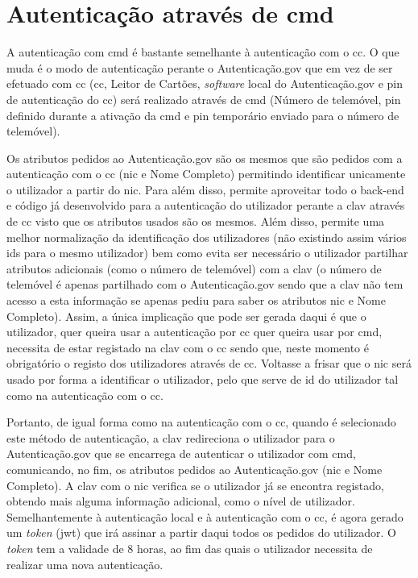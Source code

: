 \section{Autenticação através de \acrshort{cmd}}

A autenticação com \acrshort{cmd} é bastante semelhante à autenticação com o \acrshort{cc}. O que muda é o modo de autenticação perante o Autenticação.gov que em vez de ser efetuado com \acrshort{cc} (\acrlong{cc}, Leitor de Cartões, \textit{software} local do Autenticação.gov e \acrshort{pin} de autenticação do \acrshort{cc}) será realizado através de \acrshort{cmd} (Número de telemóvel, \acrshort{pin} definido durante a ativação da \acrshort{cmd} e \acrshort{pin} temporário enviado para o número de telemóvel).

Os atributos pedidos ao Autenticação.gov são os mesmos que são pedidos com a autenticação com o \acrshort{cc} (\acrshort{nic} e Nome Completo) permitindo identificar unicamente o utilizador a partir do \acrshort{nic}. Para além disso, permite aproveitar todo o back-end e código já desenvolvido para a autenticação do utilizador perante a \acrshort{clav} através de \acrshort{cc} visto que os atributos usados são os mesmos. Além disso, permite uma melhor normalização da identificação dos utilizadores (não existindo assim vários ids para o mesmo utilizador) bem como evita ser necessário o utilizador partilhar atributos adicionais (como o número de telemóvel) com a \acrshort{clav} (o número de telemóvel é apenas partilhado com o Autenticação.gov sendo que a \acrshort{clav} não tem acesso a esta informação se apenas pediu para saber os atributos \acrshort{nic} e Nome Completo). Assim, a única implicação que pode ser gerada daqui é que o utilizador, quer queira usar a autenticação por \acrshort{cc} quer queira usar por \acrshort{cmd}, necessita de estar registado na \acrshort{clav} com o \acrshort{cc} sendo que, neste momento é obrigatório o registo dos utilizadores através de \acrshort{cc}. Voltasse a frisar que o \acrshort{nic} será usado por forma a identificar o utilizador, pelo que serve de id do utilizador tal como na autenticação com o \acrshort{cc}.

Portanto, de igual forma como na autenticação com o \acrshort{cc}, quando é selecionado este método de autenticação, a \acrshort{clav} redireciona o utilizador para o Autenticação.gov que se encarrega de autenticar o utilizador com \acrshort{cmd}, comunicando, no fim, os atributos pedidos ao Autenticação.gov (\acrshort{nic} e Nome Completo). A \acrshort{clav} com o \acrshort{nic} verifica se o utilizador já se encontra registado, obtendo mais alguma informação adicional, como o nível de utilizador. Semelhantemente à autenticação local e à autenticação com o \acrshort{cc}, é agora gerado um \textit{token} (\acrshort{jwt}) que irá assinar a partir daqui todos os pedidos do utilizador. O \textit{token} tem a validade de 8 horas, ao fim das quais o utilizador necessita de realizar uma nova autenticação.

